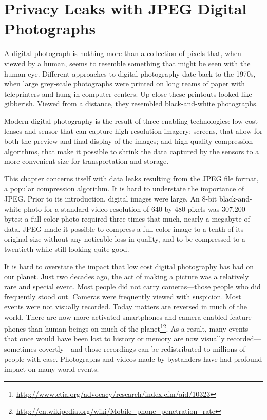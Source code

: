 \chapter{Privacy Leaks with JPEG Digital Photographs}\label{ch-jpeg}

A digital photograph is nothing more than a collection of
pixels that, when viewed by a human, seems to resemble something that
might be seen with the human eye. Different approaches to digital
photography date back to the 1970s, when large grey-scale photographs
were printed on long reams of paper with teleprinters and hung in
computer centers. Up close these printouts looked like
gibberish. Viewed from a distance, they resembled black-and-white photographs.

Modern digital photography is the result of three enabling
technologies: low-cost lenses and sensor that can capture
high-resolution imagery; screens, that allow for both the preview and
final display of the images; and high-quality compression algorithms,
that make it possible to shrink the data captured by the sensors to a
more convenient size for transportation and storage.

This chapter concerns itself with data leaks resulting from the JPEG
file format, a popular compression algorithm. It is hard to understate
the importance of JPEG. Prior to its introduction, digital images were
large. An 8-bit black-and-white photo for a standard video resolution
of 640-by-480 pixels was 307,200 bytes; a full-color photo required
three times that much, nearly a megabyte of data. JPEG made it
possible to compress a full-color image to a tenth of its original
size without any noticable loss in quality, and to be compressed to a
twentieth while still looking quite good.

It is hard to overstate the impact that low cost digital photography
has had on our planet. Just two decades ago, the act of making a
picture was a relatively rare and special event. Most people did not
carry cameras---those people who did frequently stood out. Cameras
were frequently viewed with suspicion. Most events were not visually
recorded. Today matters are reversed in much of the world. There are
now more activated smartphones and camera-enabled feature phones than
human beings on much of the
planet\footnote{\url{http://www.ctia.org/advocacy/research/index.cfm/aid/10323}}\footnote{\url{http://en.wikipedia.org/wiki/Mobile_phone_penetration_rate}}. As
a result, many events that once would have been lost to history or
memory are now visually recorded---sometimes covertly---and those
recordings can be redistributed to millions of people with
ease. Photographs and videos made by bystanders have had profound
impact on many world events.

